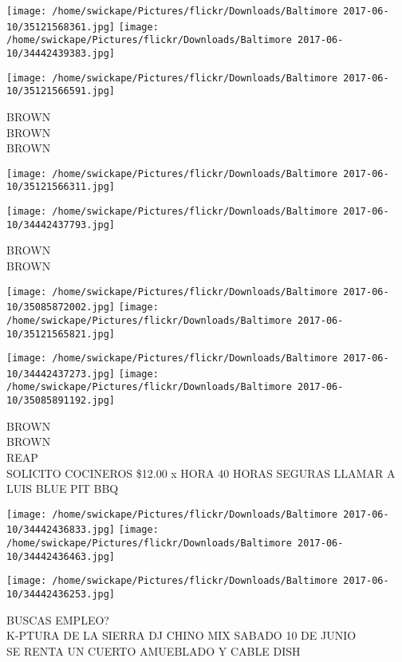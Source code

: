 \documentclass[10pt,letterpaper]{article}
\begin{document}
\texttt{[image: /home/swickape/Pictures/flickr/Downloads/Baltimore 2017-06-10/35121568361.jpg]}
\texttt{[image: /home/swickape/Pictures/flickr/Downloads/Baltimore 2017-06-10/34442439383.jpg]}

\vspace{0.25in}
\texttt{[image: /home/swickape/Pictures/flickr/Downloads/Baltimore 2017-06-10/35121566591.jpg]}

BROWN\\
BROWN\\
BROWN\\
\pagebreak

\texttt{[image: /home/swickape/Pictures/flickr/Downloads/Baltimore 2017-06-10/35121566311.jpg]}

\vspace{0.25in}
\texttt{[image: /home/swickape/Pictures/flickr/Downloads/Baltimore 2017-06-10/34442437793.jpg]}

BROWN\\
BROWN\\
\pagebreak

\texttt{[image: /home/swickape/Pictures/flickr/Downloads/Baltimore 2017-06-10/35085872002.jpg]}
\texttt{[image: /home/swickape/Pictures/flickr/Downloads/Baltimore 2017-06-10/35121565821.jpg]}

\texttt{[image: /home/swickape/Pictures/flickr/Downloads/Baltimore 2017-06-10/34442437273.jpg]}
\texttt{[image: /home/swickape/Pictures/flickr/Downloads/Baltimore 2017-06-10/35085891192.jpg]}

BROWN\\
BROWN\\
REAP\\
SOLICITO COCINEROS \$12.00 x HORA 40 HORAS SEGURAS LLAMAR A LUIS BLUE PIT BBQ\\
\pagebreak

\texttt{[image: /home/swickape/Pictures/flickr/Downloads/Baltimore 2017-06-10/34442436833.jpg]}
\texttt{[image: /home/swickape/Pictures/flickr/Downloads/Baltimore 2017-06-10/34442436463.jpg]}

\vspace{0.25in}
\texttt{[image: /home/swickape/Pictures/flickr/Downloads/Baltimore 2017-06-10/34442436253.jpg]}

BUSCAS EMPLEO?\\
K{-}PTURA DE LA SIERRA DJ CHINO MIX SABADO 10 DE JUNIO\\
SE RENTA UN CUERTO AMUEBLADO Y CABLE DISH\\
\pagebreak
\end{document}
